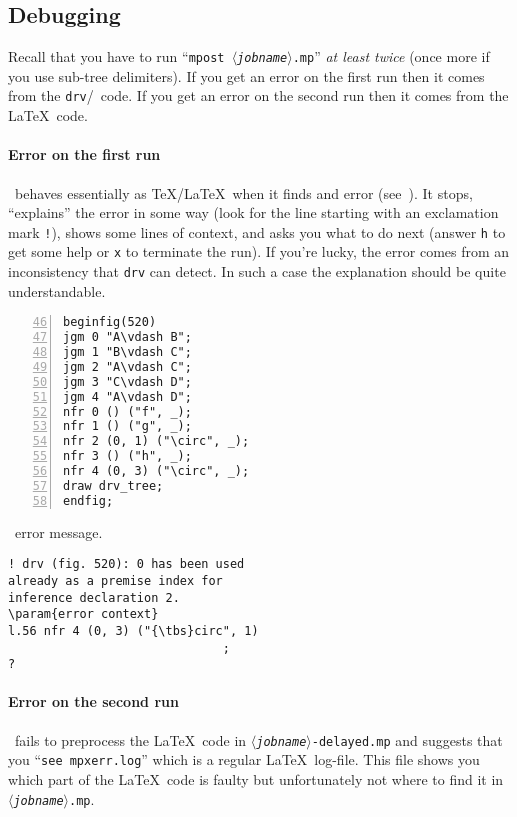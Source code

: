 \documentclass[twoside,11pt]{article}
\newcommand{\param}[1]{\textrm{\textit{$\langle$#1\/$\rangle$}}}
\newcommand{\tbs}{\textbackslash}
\begin{document}
\subsection*{Debugging}
%
%
Recall that you have to run ``\texttt{mpost \param{jobname}.mp}'' \emph{at
least twice} (once more if you use sub-tree delimiters). If you get an error on
the first run then it comes from the \texttt{drv}/\MP\ code. If you get an
error on the second run then it comes from the \LaTeX\ code.
%
%
\paragraph{Error on the first run}
\MP\ behaves essentially as \TeX/\LaTeX\ when it finds and error
(see~\cite[Debugging]{hobby09}). It stops, ``explains'' the error in some way
(look for the line starting with an exclamation mark \texttt{!}), shows some
lines of context, and asks you what to do next (answer \texttt{h} to get some
help or \texttt{x} to terminate the run). If you're lucky, the error comes from
an inconsistency that \texttt{drv} can detect. In such a case the
explanation should be quite understandable.
\begin{multicols}{2}
\begin{Verbatim}[numbers=left,firstnumber=46]
beginfig(520)
jgm 0 "A\vdash B";
jgm 1 "B\vdash C";
jgm 2 "A\vdash C";
jgm 3 "C\vdash D";
jgm 4 "A\vdash D";
nfr 0 () ("f", _);
nfr 1 () ("g", _);
nfr 2 (0, 1) ("\circ", _);
nfr 3 () ("h", _);
nfr 4 (0, 3) ("\circ", _);
draw drv_tree;
endfig;
\end{Verbatim}
\columnbreak
\MP\ error message.
\begin{Verbatim}[commandchars=\\\{\}]
! drv (fig. 520): 0 has been used
already as a premise index for
inference declaration 2.
\param{error context}
l.56 nfr 4 (0, 3) ("{\tbs}circ", 1)
                              ;
?
\end{Verbatim}
\end{multicols}
%
%
\paragraph{Error on the second run}
\MP\ fails to preprocess the \LaTeX\ code in
\texttt{\param{jobname}-delayed.mp} and suggests that you ``\texttt{see
mpxerr.log}'' which is a regular \LaTeX\ log-file. This file shows you which
part of the \LaTeX\ code is faulty but unfortunately not where to find it in
\texttt{\param{jobname}.mp}.
%
%
\end{document}
